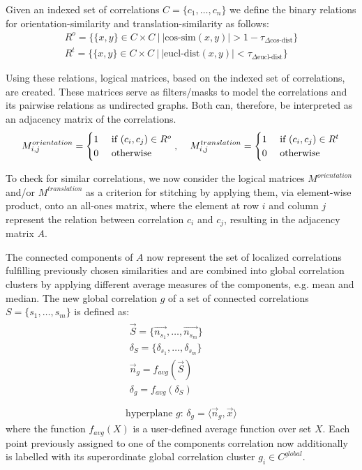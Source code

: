 Given an indexed set of correlations $C=\{c_1,\dotsc,c_n\}$ we define the binary relations for orientation-similarity and translation-similarity as follows:
\begin{align}
    R^{o}=\{\{x,y\} \in C \times C\: \big|\: |\text{cos-sim}(x,y)| > 1-\tau_{\Delta \text{cos-dist}}\}\\
    R^{t}=\{\{x,y\} \in C \times C\: \big|\: |\text{eucl-dist}(x,y)| < \tau_{\Delta \text{eucl-dist}}\}
\end{align}

Using these relations, logical matrices, based on the indexed set of correlations, are created. These matrices serve as filters/masks to model the correlations and its pairwise relations as undirected graphs. Both can, therefore, be interpreted as an adjacency matrix of the correlations.
\begin{align}
    M^{orientation}_{i,j} = 
    \begin{cases}
        1 &\text{ if } (c_i,c_j) \in R^o\\
        0 &\text{ otherwise}
    \end{cases}, \textbf{\quad}
    M^{translation}_{i,j} = 
    \begin{cases}
        1 &\text{ if } (c_i,c_j) \in R^t\\
        0 &\text{ otherwise}
    \end{cases}
\end{align}

To check for similar correlations, we now consider the logical matrices $M^{orientation}$ and/or $M^{translation}$ as a criterion for stitching by applying them, via element-wise product, onto an all-ones matrix, where the element at row $i$ and column $j$ represent the relation between correlation $c_i$ and $c_j$, resulting in the adjacency matrix $A$. 

The connected components of $A$ now represent the set of localized correlations fulfilling previously chosen similarities and are combined into global correlation clusters by applying different average measures of the components, e.g. mean and median. The new global correlation $g$ of a set of connected correlations $S=\{s_1,\dotsc, s_m\}$ is defined as:
\begin{gather}
    \begin{split}
        \vec{S} = \{\vec{n_{s_1}},\dotsc,\vec{n_{s_m}}\}\\
        \delta_S = \{\delta_{s_1},\dotsc,\delta_{s_m}\}\\
        \vec{n}_g = f_{avg}(\vec{S})\\
        \delta_g = f_{avg}(\delta_S)
    \end{split}\\
    \nonumber\\
    \text{hyperplane $g$: } \delta_g = \langle \vec{n}_g, \vec{x}\rangle
\end{gather}
where the function $f_{avg}(X)$ is a user-defined average function over set $X$. Each point previously assigned to one of the components correlation now additionally is labelled with its superordinate global correlation cluster $g_i \in C^{global}$.

